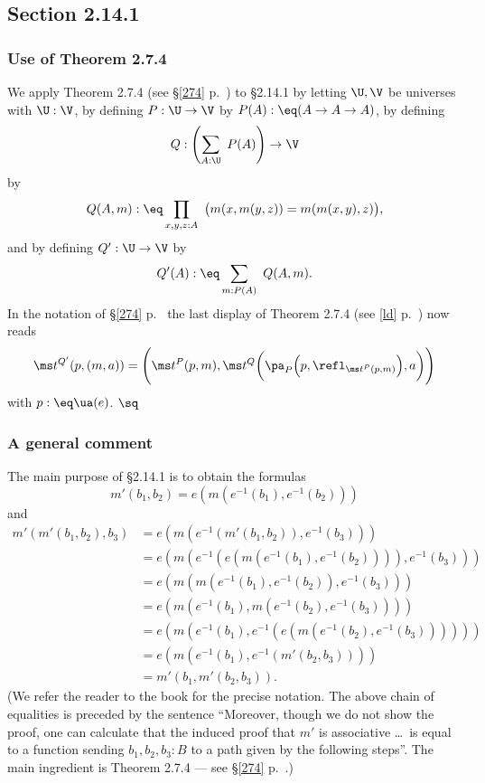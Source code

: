 \documentclass[12pt]{article}
\begin{document}

\subsection{Section 2.14.1}

\subsubsection{Use of Theorem 2.7.4}

We apply Theorem 2.7.4 (see \S\ref{274} p.~\pageref{274}) to \S2.14.1 by letting $\U,\V$ be universes with $\U:\V$, by defining $P:\U\to\V$ by $P(A):\eq(A\to A\to A)$, by defining 
$$
Q:\left(\sum_{A:\U}\ P(A)\right)\to\V
$$ 
by 
$$
Q(A,m):\eq\prod_{x,y,z:A}\ \big(m(x,m(y,z))=m(m(x,y),z)\big),
$$ 
and by defining $Q':\U\to\V$ by 
$$ 
Q'(A):\eq\sum_{m:P(A)}\ Q(A,m).
$$  
In the notation of \S\ref{274} p.~\pageref{274} the last display of Theorem 2.7.4 (see \eqref{ld} p.~\pageref{ld}) now reads 
$$
\ms t^{Q'}(p,(m,a))=\Bigg(\ms t^P(p,m),\ms t^Q\bigg(\pa_P\Big(p,\refl_{\ms t^P(p,m)}\Big),a\bigg)\Bigg)
$$ 
with $p:\eq\ua(e)$. $\sq$

\subsubsection{A general comment}

The main purpose of \S2.14.1 is to obtain the formulas
$$
m'(b_1,b_2)=e(m(e^{-1}(b_1),e^{-1}(b_2)))
$$ 
and
\begin{equation*}
  \begin{aligned}
    m'(m'(b_1,b_2),b_3)
    &= e(m(e^{-1}(m'(b_1,b_2)),e^{-1}(b_3))) \\
    &= e(m(e^{-1}(e(m(e^{-1}(b_1),e^{-1}(b_2)))),e^{-1}(b_3))) \\
    &= e(m(m(e^{-1}(b_1),e^{-1}(b_2)),e^{-1}(b_3))) \\
    &= e(m(e^{-1}(b_1),m(e^{-1}(b_2),e^{-1}(b_3)))) \\
    &= e(m(e^{-1}(b_1),e^{-1}(e(m(e^{-1}(b_2),e^{-1}(b_3)))))) \\
    &= e(m(e^{-1}(b_1),e^{-1}(m'(b_2,b_3)))) \\
    &= m'(b_1,m'(b_2,b_3)).
\end{aligned}
\end{equation*}
(We refer the reader to the book for the precise notation. The above chain of equalities is preceded by the sentence ``Moreover, though we do not show the proof, one can calculate that the induced proof that $m'$ is associative \dots\ is equal to a function sending $b_1,b_2,b_3:B$ to a path given by the following steps''. The main ingredient is Theorem 2.7.4 --- see \S\ref{274} p.~\pageref{274}.)
\end{document}
